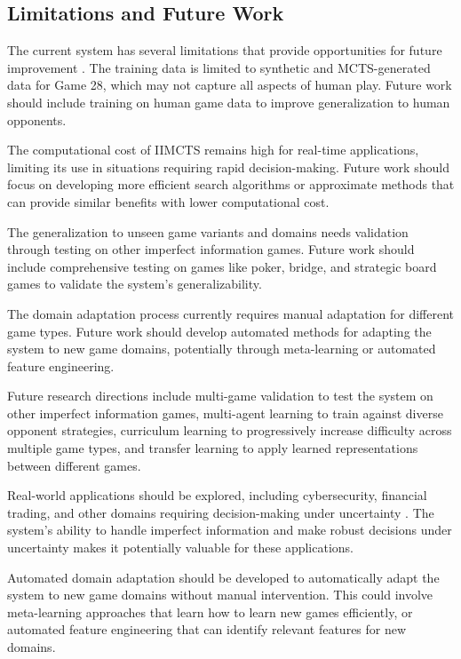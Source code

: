 \documentclass[conference]{IEEEtran}
\begin{document}
\subsection{Limitations and Future Work}

The current system has several limitations that provide opportunities for future improvement \cite{li2018deep,heinrich2016deep}. The training data is limited to synthetic and MCTS-generated data for Game 28, which may not capture all aspects of human play. Future work should include training on human game data to improve generalization to human opponents.

The computational cost of IIMCTS remains high for real-time applications, limiting its use in situations requiring rapid decision-making. Future work should focus on developing more efficient search algorithms or approximate methods that can provide similar benefits with lower computational cost.

The generalization to unseen game variants and domains needs validation through testing on other imperfect information games. Future work should include comprehensive testing on games like poker, bridge, and strategic board games to validate the system's generalizability.

The domain adaptation process currently requires manual adaptation for different game types. Future work should develop automated methods for adapting the system to new game domains, potentially through meta-learning or automated feature engineering.

Future research directions include multi-game validation to test the system on other imperfect information games, multi-agent learning to train against diverse opponent strategies, curriculum learning to progressively increase difficulty across multiple game types, and transfer learning to apply learned representations between different games.

Real-world applications should be explored, including cybersecurity, financial trading, and other domains requiring decision-making under uncertainty \cite{bowling2008regret}. The system's ability to handle imperfect information and make robust decisions under uncertainty makes it potentially valuable for these applications.

Automated domain adaptation should be developed to automatically adapt the system to new game domains without manual intervention. This could involve meta-learning approaches that learn how to learn new games efficiently, or automated feature engineering that can identify relevant features for new domains.
\end{document}
